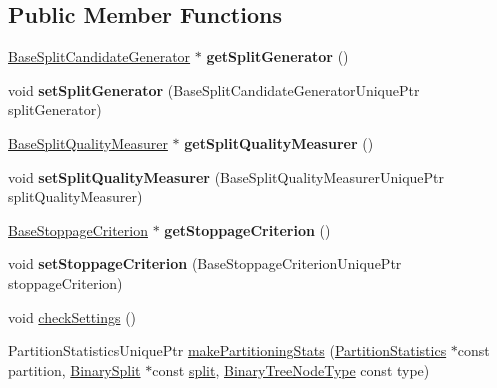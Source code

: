 \subsection*{Public Member Functions}
\begin{DoxyCompactItemize}
\item 
\hypertarget{classffactory_1_1_base_tree_classifier_a247e330e8ce0f78f3036d7fc1a8d1f77}{\hyperlink{classffactory_1_1_base_split_candidate_generator}{Base\-Split\-Candidate\-Generator} $\ast$ {\bfseries get\-Split\-Generator} ()}\label{classffactory_1_1_base_tree_classifier_a247e330e8ce0f78f3036d7fc1a8d1f77}

\item 
\hypertarget{classffactory_1_1_base_tree_classifier_af645d0173a84e1c4b6653ed3b158a591}{void {\bfseries set\-Split\-Generator} (Base\-Split\-Candidate\-Generator\-Unique\-Ptr split\-Generator)}\label{classffactory_1_1_base_tree_classifier_af645d0173a84e1c4b6653ed3b158a591}

\item 
\hypertarget{classffactory_1_1_base_tree_classifier_ac1918fd2d7a54e6158db436d0437aa1b}{\hyperlink{classffactory_1_1_base_split_quality_measurer}{Base\-Split\-Quality\-Measurer} $\ast$ {\bfseries get\-Split\-Quality\-Measurer} ()}\label{classffactory_1_1_base_tree_classifier_ac1918fd2d7a54e6158db436d0437aa1b}

\item 
\hypertarget{classffactory_1_1_base_tree_classifier_a35b137b7c73418168c8cd643602ee920}{void {\bfseries set\-Split\-Quality\-Measurer} (Base\-Split\-Quality\-Measurer\-Unique\-Ptr split\-Quality\-Measurer)}\label{classffactory_1_1_base_tree_classifier_a35b137b7c73418168c8cd643602ee920}

\item 
\hypertarget{classffactory_1_1_base_tree_classifier_ab4ee8d40db7e78c11d4dc69a613ffbaa}{\hyperlink{classffactory_1_1_base_stoppage_criterion}{Base\-Stoppage\-Criterion} $\ast$ {\bfseries get\-Stoppage\-Criterion} ()}\label{classffactory_1_1_base_tree_classifier_ab4ee8d40db7e78c11d4dc69a613ffbaa}

\item 
\hypertarget{classffactory_1_1_base_tree_classifier_a1437f2fa8542f814827abc73c92c8f26}{void {\bfseries set\-Stoppage\-Criterion} (Base\-Stoppage\-Criterion\-Unique\-Ptr stoppage\-Criterion)}\label{classffactory_1_1_base_tree_classifier_a1437f2fa8542f814827abc73c92c8f26}

\item 
void \hyperlink{classffactory_1_1_base_tree_classifier_aaf2902effacd5f8c3ea74d80d52d2922}{check\-Settings} ()
\item 
Partition\-Statistics\-Unique\-Ptr \hyperlink{classffactory_1_1_base_tree_classifier_a2e74c97ec3e034a521b75596fe0d6724}{make\-Partitioning\-Stats} (\hyperlink{classffactory_1_1_partition_statistics}{Partition\-Statistics} $\ast$const partition, \hyperlink{classffactory_1_1_binary_split}{Binary\-Split} $\ast$const \hyperlink{namespaceffactory_a1fec00d28dbea621e480fd9f221d972e}{split}, \hyperlink{namespaceffactory_a405b9095f0a093ae4770f7638f0eb730}{Binary\-Tree\-Node\-Type} const type)
\end{DoxyCompactItemize}
